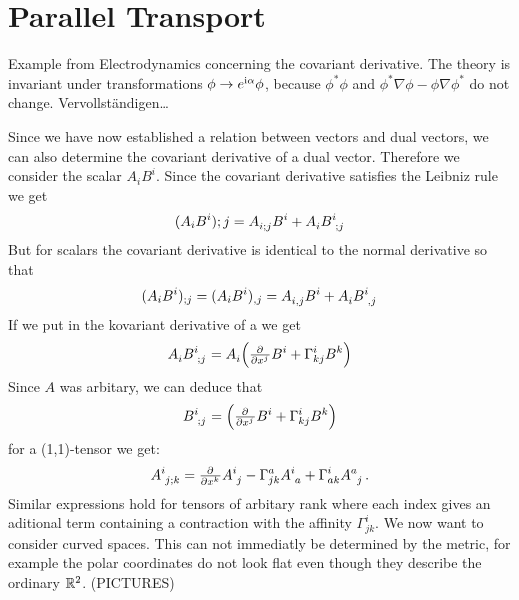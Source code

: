 \section{Parallel Transport}
\begin{remark}
Example from Electrodynamics concerning the covariant derivative. 
The theory is invariant under transformations $\phi\to e^{\mathrm{i} \alpha}\phi$, 
because $\phi^*\phi$ and $\phi^*\nabla\phi-\phi\nabla\phi^*$ do not change.
Vervollständigen\ldots
\end{remark}
Since we have now established a relation between vectors and dual vectors, we
can also determine the covariant derivative of a dual vector. Therefore we
consider the scalar $A_iB^i$. Since the covariant derivative satisfies the
Leibniz rule we get
\begin{align}
(A_iB^i);j = \tensor{A}{_i_;_j}\tensor{B}{^i}+\tensor{A}{_i}\tensor{B}{^i_;_j}
\end{align}
But for scalars the covariant derivative is identical to the normal derivative
so that 
\begin{align}
(A_iB^i)_{;j} =(A_iB^i)_{,j}=
\tensor{A}{_i_,_j}\tensor{B}{^i}+\tensor{A}{_i}\tensor{B}{^i_,_j}
\end{align}
If we put in the kovariant derivative of a we get 
\begin{equation}
\tensor{A}{_i}\tensor{B}{^i_;_j}=\tensor{A}{_i}\left(\pd{}{{x^j}}B^i+\Gamma^i_{kj}\tensor{B}{^k}\right)
\end{equation}
Since $A$ was arbitary, we can deduce that
\begin{equation}
\tensor{B}{^i_;_j}=\left(\pd{}{{x^j}}B^i+\Gamma^i_{kj}\tensor{B}{^k}\right)
\end{equation}
for a (1,1)-tensor we get:
\begin{equation}
\tensor{A}{^i_j_;_k}=\pd{}{{x^k}}\tensor{A}{^i_j}-\Gamma^a_{jk}\tensor{A}{^i_a}+\Gamma^i_{ak}\tensor{A}{^a_j}\,
.\end{equation}
Similar expressions hold for tensors of arbitary rank where each index gives an
aditional term containing a contraction with the affinity $\Gamma^i_{jk}$. 
We now want to consider curved spaces. This can not immediatly be determined by
the metric, for example the polar coordinates do not look flat even though they
describe the ordinary $\mathbb{R}^2$. (PICTURES)

